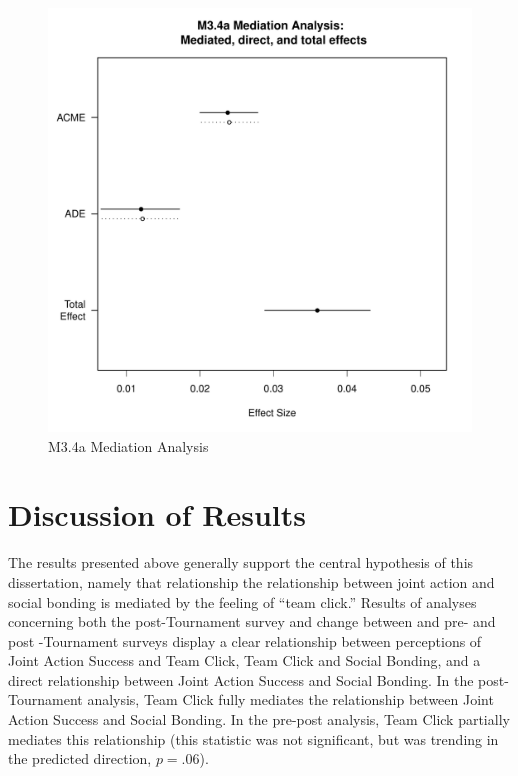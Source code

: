     \begin{figure}[htbp]
      \includegraphics[scale=.5]{images/MLM34aMediationAnalysis.pdf}
      \caption{M3.4a Mediation Analysis}
      \label{fig:MLM34aMediationAnalysis}
    \end{figure}



\clearpage

























\section{Discussion of Results}

  The results presented above generally support the central hypothesis of this dissertation, namely that relationship the relationship between joint action and social bonding is mediated by the feeling of ``team click.''  Results of analyses concerning both the post-Tournament survey and change between and pre- and post -Tournament surveys display a clear relationship between perceptions of Joint Action Success and Team Click, Team Click and Social Bonding, and a direct relationship between Joint Action Success and Social Bonding.  In the post-Tournament analysis, Team Click fully mediates the relationship between Joint Action Success and Social Bonding. In the pre-post analysis, Team Click partially mediates this relationship (this statistic was not significant, but was trending in the predicted direction, $p = .06$).

